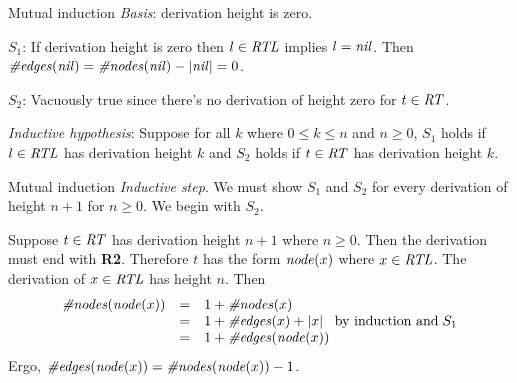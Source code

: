 \documentclass[style=sailor,size=12pt]{powerdot}
\newcommand{\id}[1]{\mbox{\it #1\/}}
\newcommand{\rid}[1]{\mbox{\rm #1}}
\begin{document}
\begin{wideslide}[bm=,toc=]{Mutual induction}
{\em Basis\/}: derivation height is zero.

\vspace{1em}
$S_1$: If derivation height is zero then $l\in\id{RTL}$ implies $l=\id{nil}$.
Then $\id{\#edges}(\id{nil})=\id{\#nodes}(\id{nil}) - |\id{nil}| = 0$.

\vspace{1em}
$S_2$: Vacuously true since there's no derivation of height zero for $t\in\id{RT}$.

\vspace{2em}
{\em Inductive hypothesis\/}:  Suppose for all $k$ where $0\leq k\leq n$ and $n\geq 0$,
$S_1$ holds if $l\in\id{RTL}$ has derivation height $k$ and
$S_2$ holds if $t\in\id{RT}$ has derivation height $k$.
\end{wideslide}

\begin{wideslide}[bm=,toc=]{Mutual induction}
{\em Inductive step}.
We must show $S_1$ and $S_2$ for every derivation of height $n+1$ for $n\geq 0$.
We begin with $S_2$.

\vspace{1em}
Suppose $t\in\id{RT}$ has derivation height $n+1$ where $n\geq 0$.
Then the derivation must end with {\bf R2}. 
Therefore $t$ has the form $\id{node}(x)$
where $x\in\id{RTL}$.
The derivation of $x\in\id{RTL}$ has height $n$.
Then
\begin{displaymath}
\begin{array}{lll}
\id{\#nodes}(\id{node}(x)) & = & 1 + \id{\#nodes}(x) \\
	& = & 1+\id{\#edges}(x) + |x|\;\;\;\rid{by induction and}\;S_1 \\
	& = & 1+\id{\#edges}(\id{node}(x))
\end{array}
\end{displaymath}
Ergo, $\id{\#edges}(\id{node}(x))=\id{\#nodes}(\id{node}(x))-1$.
\end{wideslide}
\end{document}
